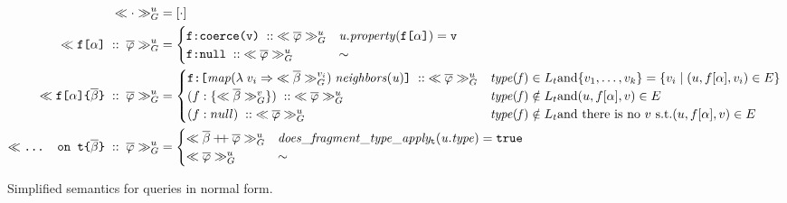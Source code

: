 \setcounter{equation}{0}%
\begin{figure*}[h]
    \centering
    \begin{align}
    \ll \cdot \gg^{u}_{G} &= [\cdot] \\
    \ll \texttt{f[}\alpha\texttt{]}\; ::\; \overline{\varphi} \gg^{u}_{G} &= \begin{cases}
    \texttt{f}\texttt{:}\texttt{coerce(\texttt{v})} \; ::\; \ll \overline{\varphi} \gg^{u}_{G}  & \mathit{u.property}(\texttt{f[}\alpha\texttt{]}) = \texttt{v} \\
    \texttt{f}\texttt{:}\texttt{null} \; :: \; \ll \overline{\varphi} \gg^{u}_{G} & \sim
    \end{cases}\\
    \ll \texttt{f[}\alpha\texttt{]} \texttt{\{}\overline{\beta}\texttt{\}} \; ::\; \overline{\varphi} \gg^{u}_{G} &=
    \begin{cases}
    \texttt{f}\texttt{:}\texttt{[} \mathit{map} (\lambda\; v_{i} \Rightarrow\; \ll \overline{\beta} \gg^{v_{i}}_{G})\; \mathit{neighbors(u)} \texttt{]} \; :: \; \ll \overline{\varphi} \gg^{u}_{G}  & \mathit{type(f)} \in L_{t} \text{and} \{v_{1}, \ldots, v_{k}\} = \{v_{i} \mid (u, f[\alpha], v_{i}) \in E\} \\
    (f:\{\ll \overline{\beta} \gg^{v}_{G}\})\; :: \; \ll \overline{\varphi} \gg^{u}_{G}  & \mathit{type(f)} \notin L_{t} \text{and} (u, f[\alpha], v) \in E \\
    (f:null)\; :: \; \ll \overline{\varphi} \gg^{u}_{G} & \mathit{type(f)} \notin L_{t} \text{and there is no } v \text{ s.t.} (u, f[\alpha], v) \in E \\
    \end{cases}\\
    \ll \texttt{... on t}\texttt{\{}\overline{\beta}\texttt{\}}\; ::\; \overline{\varphi} \gg^{u}_{G} &= \begin{cases}
    \ll \overline{\beta} \mathbin{+\mkern-5mu+} \overline{\varphi} \gg^{u}_{G} & \mathit{does\_fragment\_type\_apply_{\texttt{t}}(u.type)} = \texttt{true}\\
    \ll \overline{\varphi} \gg^{u}_{G} & \sim
    \end{cases}
    \end{align}
    \caption{Simplified semantics for queries in normal form.}
    \label{fig:simpl_semantics}
\end{figure*}


